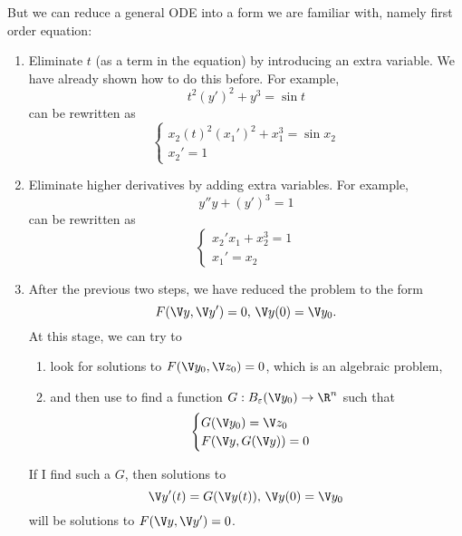 \documentclass[a4paper]{article}
\theoremstyle{definition}
\begin{document}
But we can reduce a general ODE into a form we are familiar with, namely first order equation:
\begin{enumerate}
\item Eliminate \(t\) (as a term in the equation) by introducing an extra variable. We have already shown how to do this before. For example,
  \[
    t^2(y')^2 + y^3 = \sin t
  \]
  can be rewritten as
  \[
    \begin{cases}
      x_2(t)^2(x_1')^2 + x_1^3 = \sin x_2 \\
      x_2' = 1
    \end{cases}
  \]
\item Eliminate higher derivatives by adding extra variables. For example,
  \[
    y''y+ (y')^3 = 1
  \]
  can be rewritten as
  \[
    \begin{cases}
      x_2'x_1 + x_2^3 = 1 \\
      x_1' = x_2
    \end{cases}
  \]
\item After the previous two steps, we have reduced the problem to the form
  \[
    F(\V y, \V y') = 0, \, \V y(0) = \V y_0.
  \]
  At this stage, we can try to
  \begin{enumerate}
  \item look for solutions to \(F(\V y_0, \V z_0) = 0\), which is an algebraic problem,
  \item and then use  to find a function \(G: B_\varepsilon(\V y_0) \to \R^n\) such that
    \[
     \begin{cases} 
       G(\V y_0) = \V z_0 \\
       F(\V y, G(\V y)) = 0
    \end{cases}
    \]
  \end{enumerate}
  If I find such a \(G\), then solutions to
  \[
    \V y'(t) = G(\V y(t)), \, \V y(0) = \V y_0
  \]
  will be solutions to \(F(\V y, \V y') = 0\).
\end{enumerate}

\printindex
\end{document}
